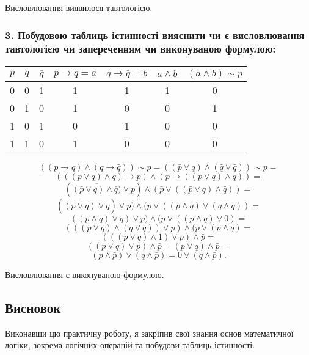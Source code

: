 \documentclass[14pt]{extreport}
\begin{document}
\medskip
Висловлювання виявилося тавтологією.

\subsubsection*{3. Побудовою таблиць істинності вияснити чи є висловлювання тавтологією чи запереченням чи виконуваною формулою:}

\begin{center}
\begin{tabular}{|c|c|c|c|c|c|c|}
	\hline
	$p$ & $q$ & $\bar q$ & $p\to q=a$ & $q\to \bar q = b$
	& $a \land b$ & $(a\land b)\sim p $\\
	\hline
	0 & 0 & 1 & 1 & 1 & 1 & 0 \\
	\hline
	0 & 1 & 0 & 1 & 0 & 0 & 1 \\
	\hline
	1 & 0 & 1 & 0 & 1 & 0 & 0 \\
	\hline
	1 & 1 & 0 & 1 & 0 & 0 & 0 \\
	\hline
\end{tabular}
\end{center}

$$
((p\to q)\land(q\to \bar q))\sim p =
((\bar p \lor q) \land (\bar q \lor \bar q))\sim p =
$$
$$
(((\bar p \lor q) \land \bar q)\to p) \land
(p \to ((\bar p \lor q) \land \bar q))=
$$
$$
(\overline{(\bar p \lor q) \land \bar q)}\lor p) \land
(\bar p \lor ((\bar p \lor q)\land \bar q))=
$$
$$
(\overline{(\bar p \lor q)} \lor q)\lor p) \land
(\bar p \lor ((\bar p \land \bar q)\lor (q \land \bar q))=
$$
$$
((p \land \bar q) \lor q)\lor p) \land
(\bar p \lor ((\bar p \land \bar q)\lor 0)=
$$
$$
(((p\lor q) \land (\bar q \lor q))\lor p) \land
(\bar p \lor (\bar p \land \bar q)=
$$
$$
(((p\lor q) \land 1)\lor p) \land
\bar p =
$$
$$
((p\lor q) \lor p) \land
\bar p =
(p\lor q) \land \bar p=
$$
$$
(p\land \bar p) \lor (q\land \bar p)=0\lor(q\land\bar p).
$$

Висловлювання є виконуваною формулою.

\subsection*{Висновок}

Виконавши цю практичну роботу, я закріпив свої знання
основ математичної логіки, зокрема логічних операцій
та побудови таблиць істинності.
\end{document}

